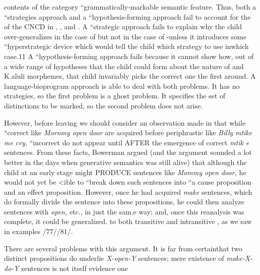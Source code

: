 contents of the category ``grammatically-markable semantic feature. Thus, both a ``strategies approach and a ``hypothesis-forming
approach fail to account for the  of the CNCD in ,
, and . A ``strategic approach fails to explain why the
child over-generalizes in the case of   but not in the case of  -unless it introduces some ``hyperstrategic device which would tell the child which strategy to use inwhich case.11 A ``hypothesis-forming approach fails because it cannot show how, out of a wide range of hypotheses that the child could form about the nature of  and K.aluli morphemes, that child invariably picks the correct one the first  around. A language-bioprogram approach is able to deal with both problems. It has no strategies, so the first problem is a ghost problem. It specifies the set of distinctions to be marked, so the second problem does not arise.

However, before leaving  we should consider an obser\-vation made in \citet{Bowerman1974} that while ``correct  like \textit{Mornmy open door }are acquired before periphrastic  like \textit{Billy }\textit{mtike} \textit{me} \textit{cry,} ``incorrect  do not appear until AFTER the emergence of correct \textit{mtik} \textit{e} sentences. From these facts, Bowerman argued (and the argument sounded a lot better in the days when genera\-tive semantics was still alive) that although the child at an early stage might PRODUCE sentences like \textit{Mommy open door, }he would not yet be {\textless}ible to ``break down such sentences into ``a cause proposition and an effect proposition. However, once he had acquired \textit{make} sentences, which do formally divide the sentence into these proposi\-tions, he could then analyze sentences with \textit{open, }etc., in just the sam.e way; and, once this reanalysis was complete, it could be generalized. to both transitive and intransitive , as we saw in examples
/77//81/.

There are several problems with this argument. It is far from certainthat two distinct propositions do underlie \textit{X-open-Y }sentences; mere existence of \textit{make-X-do-Y }sentences is not itself evidence one

